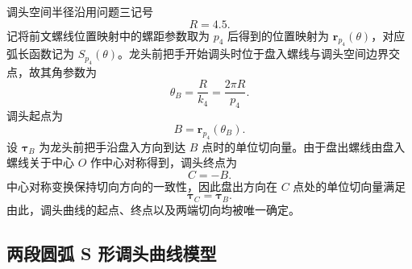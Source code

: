 调头空间半径沿用问题三记号
\begin{equation}
    R=4.5.
    \label{eq:p4-turning-radius}
\end{equation}
记将前文螺线位置映射中的螺距参数取为 $p_4$ 后得到的位置映射为 $\bm r_{p_4}(\theta)$，对应弧长函数记为 $S_{p_4}(\theta)$。龙头前把手开始调头时位于盘入螺线与调头空间边界交点，故其角参数为
\begin{equation}
    \theta_B=\frac{R}{k_4}=\frac{2\pi R}{p_4}.
    \label{eq:p4-theta-B}
\end{equation}
调头起点为
\begin{equation}
    B=\bm r_{p_4}(\theta_B).
    \label{eq:p4-start-point}
\end{equation}
设 $\bm\tau_B$ 为龙头前把手沿盘入方向到达 $B$ 点时的单位切向量。由于盘出螺线由盘入螺线关于中心 $O$ 作中心对称得到，调头终点为
\begin{equation}
    C=-B.
    \label{eq:p4-end-point}
\end{equation}
中心对称变换保持切向方向的一致性，因此盘出方向在 $C$ 点处的单位切向量满足
\begin{equation}
    \bm\tau_C=\bm\tau_B.
    \label{eq:p4-end-tangent}
\end{equation}
由此，调头曲线的起点、终点以及两端切向均被唯一确定。

\subsection{两段圆弧 S 形调头曲线模型}

